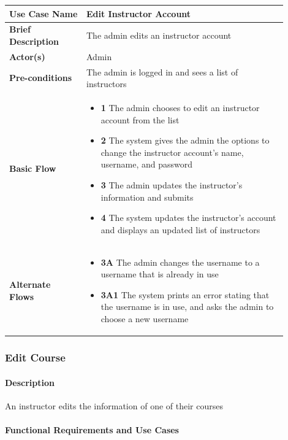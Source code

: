 \documentclass{article}
\begin{document}
\begin{tabular}{| p{0.25\linewidth} | p{0.65\linewidth} |}
  \hline
  \textbf{Use Case Name} & Edit Instructor Account \\
  \hline
  \textbf{Brief Description} & The admin edits an instructor account \\
  \hline
  \textbf{Actor(s)} & Admin \\
  \hline
  \textbf{Pre-conditions} & The admin is logged in and sees a list of instructors\\
  \hline
  \textbf{Basic Flow} & \begin{itemize}
    \item[] \textbf{1} The admin chooses to edit an instructor account from the list
    \item[] \textbf{2} The system gives the admin the options to change the instructor account's name, username, and password
    \item[] \textbf{3} The admin updates the instructor's information and submits
    \item[] \textbf{4} The system updates the instructor's account and displays an updated list of instructors
  \end{itemize}\\
  \hline
  \textbf{Alternate Flows} & \begin{itemize}
    \item[] \textbf{3A} The admin changes the username to a username that is already in use
    \item[] \textbf{3A1} The system prints an error stating that the username is in use, and asks the admin to choose a new username
  \end{itemize}\\
  \hline
\end{tabular}

\subsubsection{Edit Course}

\paragraph{Description} An instructor edits the information of one of their courses

\paragraph{Functional Requirements and Use Cases}
\end{document}
